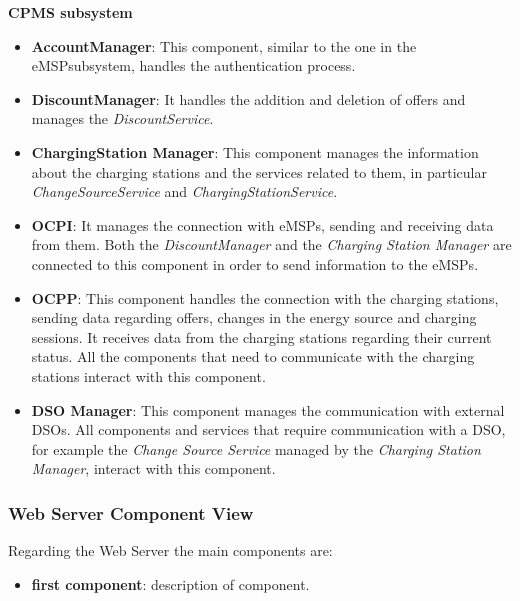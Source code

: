 \documentclass[table, 12pt]{article}
\begin{document}
\textbf{CPMS subsystem}
\begin{itemize}
    \item \textbf{AccountManager}: This component, similar to the one in the eMSPsubsystem, handles the authentication process. 
    \item \textbf{DiscountManager}: It handles the addition and deletion of offers and manages the \textit{DiscountService}.
    \item \textbf{ChargingStation Manager}: This component manages the information about the charging stations and the services related to them, in particular \textit{ChangeSourceService} and \textit{ChargingStationService}.
    \item \textbf{OCPI}: It manages the connection with eMSPs, sending and receiving data from them. Both the \textit{DiscountManager} and the \textit{Charging Station Manager} are connected to this component in order to send information to the eMSPs.
    \item \textbf{OCPP}: This component handles the connection with the charging stations, sending data regarding offers, changes in the energy source and charging sessions. It receives data from the charging stations regarding their current status. All the components that need to communicate with the charging stations interact with this component.
    \item \textbf{DSO Manager}: This component manages the communication with external DSOs. All components and services that require communication with a DSO, for example the \textit{Change Source Service} managed by the \textit{Charging Station Manager}, interact with this component.
\end{itemize}
\subsubsection*{Web Server Component View}
Regarding the Web Server the main components are:
\begin{itemize}
    \item \textbf{first component}: description of component.
\end{itemize}

\newpage
\end{document}
